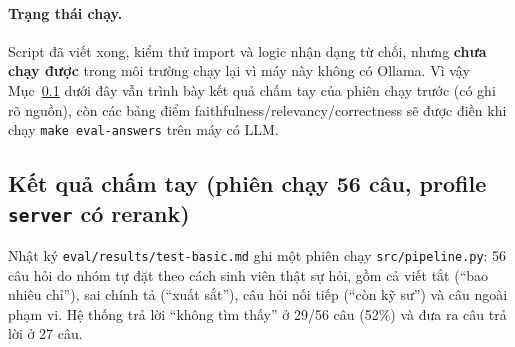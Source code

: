 \paragraph{Trạng thái chạy.} Script đã viết xong, kiểm thử import và logic nhận dạng từ chối, nhưng
\textbf{chưa chạy được} trong môi trường chạy lại vì máy này không có Ollama. Vì vậy Mục~\ref{sec:tra-loi-thu-cong}
dưới đây vẫn trình bày kết quả chấm tay của phiên chạy trước (có ghi rõ nguồn), còn các bảng điểm
faithfulness/relevancy/correctness sẽ được điền khi chạy \texttt{make eval-answers} trên máy có LLM.

\subsection{Kết quả chấm tay (phiên chạy 56 câu, profile \texttt{server} có rerank)}
\label{sec:tra-loi-thu-cong}

Nhật ký \texttt{eval/results/test-basic.md} ghi một phiên chạy \texttt{src/pipeline.py}: 56 câu hỏi do
nhóm tự đặt theo cách sinh viên thật sự hỏi, gồm cả viết tắt (``bao nhiêu chỉ''), sai chính tả
(``xuất sắt''), câu hỏi nối tiếp (``còn kỹ sư'') và câu ngoài phạm vi. Hệ thống trả lời ``không tìm
thấy'' ở 29/56 câu (52\%) và đưa ra câu trả lời ở 27 câu.

